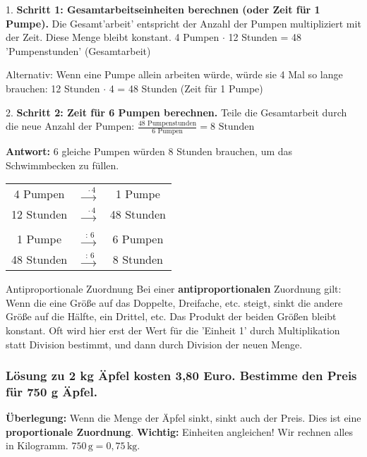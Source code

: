 \begin{loesungsumgebung}[loes:2.3]{}
1.  \textbf{Schritt 1: Gesamtarbeitseinheiten berechnen (oder Zeit für 1 Pumpe).}
    Die Gesamt'arbeit' entspricht der Anzahl der Pumpen multipliziert mit der Zeit. Diese Menge bleibt konstant.
    4 Pumpen $\cdot$ 12 Stunden = 48 'Pumpenstunden' (Gesamtarbeit)

    Alternativ: Wenn eine Pumpe allein arbeiten würde, würde sie 4 Mal so lange brauchen:
    12 Stunden $\cdot$ 4 = 48 Stunden (Zeit für 1 Pumpe)

2.  \textbf{Schritt 2: Zeit für 6 Pumpen berechnen.}
    Teile die Gesamtarbeit durch die neue Anzahl der Pumpen:
    $\frac{48 \text{ Pumpenstunden}}{6 \text{ Pumpen}} = 8 \text{ Stunden}$

\textbf{Antwort:} 6 gleiche Pumpen würden 8 Stunden brauchen, um das Schwimmbecken zu füllen.

\begin{center}
\begin{tabular}{c c c}
    4 Pumpen & $\xrightarrow{\text{ } \cdot 4}$ & 1 Pumpe \\
    12 Stunden & $\xrightarrow{\text{ } \cdot 4}$ & 48 Stunden \\
    \quad \\
    1 Pumpe & $\xrightarrow{\text{ : } 6}$ & 6 Pumpen \\
    48 Stunden & $\xrightarrow{\text{ : } 6}$ & 8 Stunden \\
\end{tabular}
\end{center}
\begin{merksatzumgebung}{Antiproportionale Zuordnung}
Bei einer \textbf{antiproportionalen} Zuordnung gilt: Wenn die eine Größe auf das Doppelte, Dreifache, etc. steigt, sinkt die andere Größe auf die Hälfte, ein Drittel, etc. Das Produkt der beiden Größen bleibt konstant. Oft wird hier erst der Wert für die 'Einheit 1' durch Multiplikation statt Division bestimmt, und dann durch Division der neuen Menge.
\end{merksatzumgebung}

\subsubsection*{Lösung zu 2 kg Äpfel kosten 3,80 Euro. Bestimme den Preis für 750 g Äpfel.}

\textbf{Überlegung:} Wenn die Menge der Äpfel sinkt, sinkt auch der Preis. Dies ist eine \textbf{proportionale Zuordnung}.
\textbf{Wichtig:} Einheiten angleichen! Wir rechnen alles in Kilogramm. $750\,\text{g} = 0,75\,\text{kg}$.


\end{loesungsumgebung}
